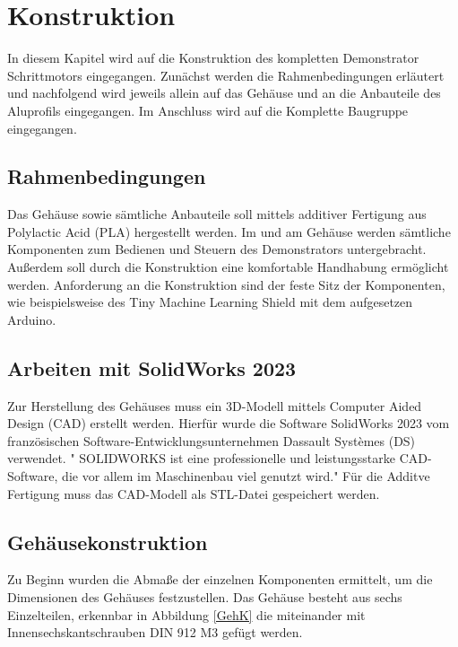 %
%

\chapter{Konstruktion}
In diesem Kapitel wird auf die Konstruktion des kompletten Demonstrator Schrittmotors eingegangen. Zunächst werden die Rahmenbedingungen erläutert und nachfolgend wird jeweils allein auf das Gehäuse und an die Anbauteile des Aluprofils eingegangen. Im Anschluss wird auf die Komplette Baugruppe eingegangen. 

\section{Rahmenbedingungen}
Das Gehäuse sowie sämtliche Anbauteile soll mittels additiver Fertigung aus Polylactic Acid (PLA) hergestellt werden. Im und am Gehäuse werden sämtliche Komponenten zum Bedienen und Steuern des Demonstrators untergebracht. Außerdem soll durch die Konstruktion eine komfortable Handhabung ermöglicht werden. Anforderung an die Konstruktion sind der feste Sitz der Komponenten, wie beispielsweise des Tiny Machine Learning Shield mit dem aufgesetzen Arduino. 

\section{Arbeiten mit SolidWorks 2023}
Zur Herstellung des Gehäuses muss ein 3D-Modell mittels Computer Aided Design (CAD) erstellt werden. Hierfür wurde die Software SolidWorks 2023 vom französischen Software-Entwicklungsunternehmen Dassault Systèmes (DS) verwendet. " SOLIDWORKS ist eine professionelle und leistungsstarke CAD-Software, die vor allem 
im Maschinenbau viel genutzt wird." \cite{Weber.2024} Für die Additve Fertigung muss das CAD-Modell als STL-Datei gespeichert werden. 

\section{Gehäusekonstruktion}
Zu Beginn wurden die Abmaße der einzelnen Komponenten ermittelt, um die Dimensionen des Gehäuses festzustellen. Das Gehäuse besteht aus sechs Einzelteilen, erkennbar in Abbildung \ref{GehK} die miteinander mit Innensechskantschrauben DIN 912 M3 gefügt werden.

